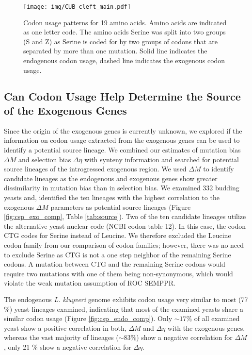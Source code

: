 \documentclass[doublespacing,linenumbers]{bmcart}
\newcommand{\kluyveri}{\textit{L. kluyveri}\xspace}
\newcommand{\ROC}{ROC SEMPPR\xspace}
\newcommand{\DM}{\ensuremath{{\Delta M}}\xspace}
\newcommand{\DE}{\ensuremath{{\Delta \eta}}\xspace}
\begin{document}

\begin{figure}
     \centering
	\texttt{[image: img/CUB\_cleft\_main.pdf]}
	\caption{Codon usage patterns for 19 amino acids. Amino acids are indicated as one letter code. 
	The amino acids Serine was split into two groups (S and Z) as Serine is coded for by two groups of codons that are separated by more than one mutation.
	Solid line indicates the endogenous codon usage, dashed line indicates the exogenous codon usage.}
	\label{fig:cub_endo_exo}
\end{figure}



\subsection*{Can Codon Usage Help Determine the Source of the Exogenous Genes}

Since the origin of the exogenous genes is currently unknown, we explored if the information on codon usage extracted from the exogenous genes can be used to identify a potential source lineage. 
We combined our estimates of mutation bias \DM and selection bias \DE with synteny information and searched for potential source lineages of the introgressed exogenous region.
We used \DM to identify candidate lineages as the endogenous and exogenous genes show greater dissimilarity in mutation bias than in selection bias.
We examined 332 budding yeasts \citep{shen2018} and, identified the ten lineages with the highest correlation to the exogenous \DM parameters as potential source lineages (Figure \ref{fig:csp_exo_comp}, Table \ref{tab:source}).
Two of the ten candidate lineages utilize the alternative yeast nuclear code (NCBI codon table 12). 
In this case, the codon CTG codes for Serine instead of Leucine. 
We therefore excluded the Leucine codon family from our comparison of codon families; however, there was no need to exclude Serine as CTG is not a one step neighbor of the remaining Serine codons.
A mutation between CTG and the remaining Serine codons would require two mutations with one of them being non-synonymous, which would violate the weak mutation assumption of \ROC.

The endogenous \kluyveri genome exhibits codon usage very similar to most (77 \%) yeast lineages examined, indicating that most of the examined yeasts share a similar codon usage (Figure \ref{fig:csp_endo_comp}).
Only $\sim 17 \%$ of all examined yeast show a positive correlation in both, \DM and \DE with the exogenous genes, whereas the vast majority of lineages ($\sim 83 \%$) show a negative correlation for \DM, only 21 \% show a negative correlation for \DE.
\end{document}
